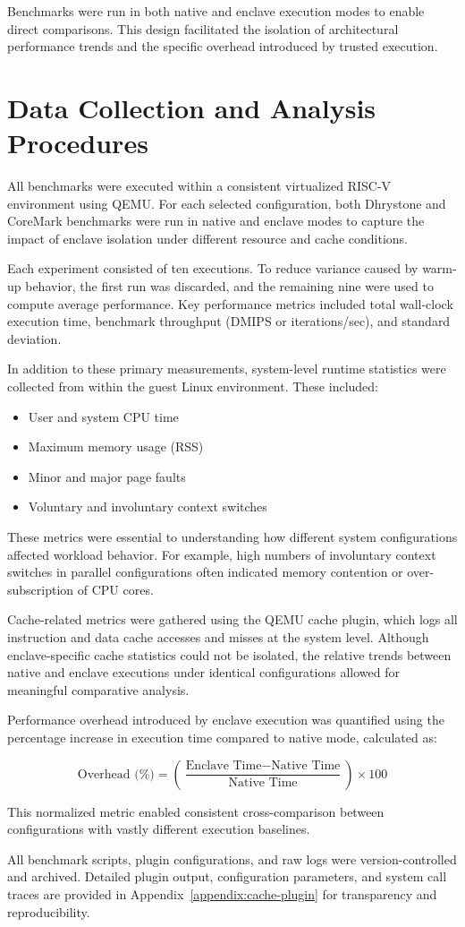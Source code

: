 Benchmarks were run in both native and enclave execution modes to enable direct comparisons. This design facilitated the isolation of architectural performance trends and the specific overhead introduced by trusted execution.

\section{Data Collection and Analysis Procedures}
\label{sec:data-collection}

All benchmarks were executed within a consistent virtualized RISC-V environment using QEMU. For each selected configuration, both Dhrystone and CoreMark benchmarks were run in native and enclave modes to capture the impact of enclave isolation under different resource and cache conditions.

Each experiment consisted of ten executions. To reduce variance caused by warm-up behavior, the first run was discarded, and the remaining nine were used to compute average performance. Key performance metrics included total wall-clock execution time, benchmark throughput (DMIPS or iterations/sec), and standard deviation.

In addition to these primary measurements, system-level runtime statistics were collected from within the guest Linux environment. These included:

\begin{itemize}
    \item User and system CPU time
    \item Maximum memory usage (RSS)
    \item Minor and major page faults
    \item Voluntary and involuntary context switches
\end{itemize}

These metrics were essential to understanding how different system configurations affected workload behavior. For example, high numbers of involuntary context switches in parallel configurations often indicated memory contention or over-subscription of CPU cores.

Cache-related metrics were gathered using the QEMU cache plugin, which logs all instruction and data cache accesses and misses at the system level. Although enclave-specific cache statistics could not be isolated, the relative trends between native and enclave executions under identical configurations allowed for meaningful comparative analysis.

Performance overhead introduced by enclave execution was quantified using the percentage increase in execution time compared to native mode, calculated as:

\[
\text{Overhead (\%)} = \left( \frac{\text{Enclave Time} - \text{Native Time}}{\text{Native Time}} \right) \times 100
\]

This normalized metric enabled consistent cross-comparison between configurations with vastly different execution baselines.

All benchmark scripts, plugin configurations, and raw logs were version-controlled and archived. Detailed plugin output, configuration parameters, and system call traces are provided in Appendix~\ref{appendix:cache-plugin} for transparency and reproducibility.

